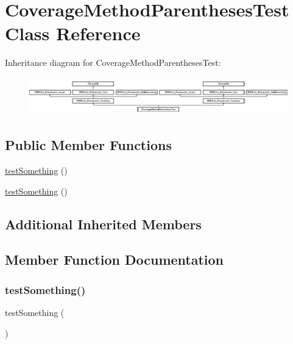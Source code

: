 \hypertarget{class_coverage_method_parentheses_test}{}\section{Coverage\+Method\+Parentheses\+Test Class Reference}
\label{class_coverage_method_parentheses_test}
Inheritance diagram for Coverage\+Method\+Parentheses\+Test\+:\begin{figure}[H]
\begin{center}
\leavevmode
\includegraphics[height=1.651917cm]{class_coverage_method_parentheses_test}
\end{center}
\end{figure}
\subsection*{Public Member Functions}
\begin{DoxyCompactItemize}
\item 
\mbox{\hyperlink{class_coverage_method_parentheses_test_a0fc4e17369bc9607ebdd850d9eda8167}{test\+Something}} ()
\item 
\mbox{\hyperlink{class_coverage_method_parentheses_test_a0fc4e17369bc9607ebdd850d9eda8167}{test\+Something}} ()
\end{DoxyCompactItemize}
\subsection*{Additional Inherited Members}


\subsection{Member Function Documentation}
\mbox{\label{class_coverage_method_parentheses_test_a0fc4e17369bc9607ebdd850d9eda8167}} 
\subsubsection{\texorpdfstring{test\+Something()}{testSomething()}\hspace{0.1cm}{\footnotesize\ttfamily [1/2]}}
{\footnotesize\ttfamily test\+Something (\begin{DoxyParamCaption}{ }\end{DoxyParamCaption})}


